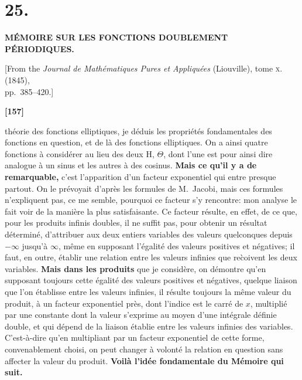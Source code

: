 \documentclass[11pt,a4paper]{article}
\begin{document}
\setlength{\parindent}{1em}
\setlength{\parskip}{0.3em}

\section*{25.}

\begin{center}
\textbf{M\'EMOIRE SUR LES FONCTIONS DOUBLEMENT P\'ERIODIQUES.}
\end{center}

\begin{center}
[From the \textit{Journal de Math\'ematiques Pures et Appliqu\'ees} (Liouville), tome \textsc{x}. (1845),\\
pp.~385--420.]
\end{center}


\textbf{[157]}

th\'eorie des fonctions elliptiques, je d\'eduis les propri\'et\'es fondamentales des fonctions
en question, et de l\`a des fonctions elliptiques. On a ainsi quatre fonctions \`a consid\'erer
au lieu des deux H, $\Theta$, dont l'une est pour ainsi dire analogue \`a un sinus et les
autres \`a des cosinus. \textbf{Mais ce qu'il y a de remarquable,} c'est l'apparition d'un
facteur exponentiel qui entre presque partout. On le pr\'evoyait d'apr\`es les formules de
M.~Jacobi, mais ces formules n'expliquent pas, ce me semble, pourquoi ce facteur s'y
rencontre: mon analyse le fait voir de la mani\`ere la plus satisfaisante. Ce facteur
r\'esulte, en effet, de ce que, pour les produits infinis doubles, il ne suffit pas, pour
obtenir un r\'esultat d\'etermin\'e, d'attribuer aux deux entiers variables des valeurs quelconques
depuis $-\infty$ jusqu'\`a $\infty$, m\^eme en supposant l'\'egalit\'e des valeurs positives
et n\'egatives; il faut, en outre, \'etablir une relation entre les valeurs infinies que
re\`coivent les deux variables. \textbf{Mais dans les produits} que je consid\`ere, on d\'emontre
qu'en supposant toujours cette \'egalit\'e des valeurs positives et n\'egatives, quelque liaison
que l'on \'etablisse entre les valeurs infinies, il r\'esulte toujours la m\^eme valeur du
produit, \`a un facteur exponentiel pr\`es, dont l'indice est le carr\'e de $x$, multipli\'e par
une constante dont la valeur s'exprime au moyen d'une int\'egrale d\'efinie double, et qui
d\'epend de la liaison \'etablie entre les valeurs infinies des variables. C'est-\`a-dire qu'en
multipliant par un facteur exponentiel de cette forme, convenablement choisi, on peut
changer \`a volont\'e la relation en question sans affecter la valeur du produit. \textbf{Voil\`a
l'id\'ee fondamentale du M\'emoire qui suit.}
\end{document}
